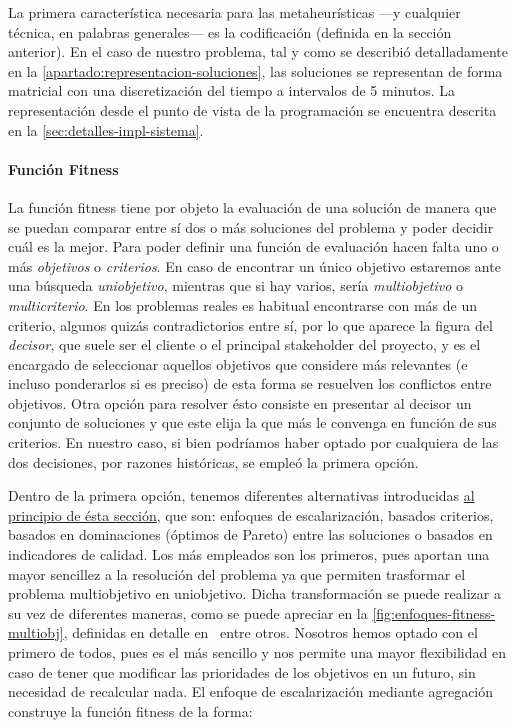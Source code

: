 La primera característica necesaria para las metaheurísticas ---y cualquier técnica, en palabras generales--- es la codificación (definida en la sección anterior). En el caso de nuestro problema, tal y como se describió detalladamente en la \autoref{apartado:representacion-soluciones}, las soluciones se representan de forma matricial con una discretización del tiempo a intervalos de 5 minutos. La representación desde el punto de vista de la programación se encuentra descrita en la \autoref{sec:detalles-impl-sistema}. %


\paragraph{Función Fitness} \label{apartado:adaptacion-fitness}

La función fitness tiene por objeto la evaluación de una solución de manera que se puedan comparar entre sí dos o más soluciones del problema y poder decidir cuál es la mejor.  Para poder definir una función de evaluación hacen falta uno o más \textit{objetivos} o \textit{criterios}. En caso de encontrar un único objetivo estaremos ante una búsqueda \textit{uniobjetivo}, mientras que si hay varios, sería \textit{multiobjetivo} o \textit{multicriterio}. En los problemas reales es habitual encontrarse con más de un criterio, algunos quizás contradictorios entre sí, por lo que aparece la figura del \textit{decisor}, que suele ser el cliente o el principal stakeholder del proyecto, y es el encargado de seleccionar aquellos objetivos que considere más relevantes (e incluso ponderarlos si es preciso) de esta forma se resuelven los conflictos entre objetivos. Otra opción para resolver ésto consiste en presentar al decisor un conjunto de soluciones y que este elija la que más le convenga en función de sus criterios. En nuestro caso, si bien podríamos haber optado por cualquiera de las dos decisiones, por razones históricas, se empleó la primera opción. 

Dentro de la primera opción, tenemos diferentes alternativas introducidas \hyperref[sec:3:metaheurística]{al principio de ésta sección}, que son: enfoques de escalarización, basados criterios, basados en dominaciones (óptimos de Pareto) entre las soluciones o basados en indicadores de calidad. Los más empleados son los primeros, pues aportan una mayor sencillez a la resolución del problema ya que permiten trasformar el problema multiobjetivo en uniobjetivo. Dicha transformación se puede realizar a su vez de diferentes maneras, como se puede apreciar en la \autoref{fig:enfoques-fitness-multiobj}, definidas en detalle en~\cite{sota:metaheuristicas-design-impl} entre otros. Nosotros hemos optado con el primero de todos, pues es el más sencillo y nos permite una mayor flexibilidad en caso de tener que modificar las prioridades de los objetivos en un futuro, sin necesidad de recalcular nada. El enfoque de escalarización mediante agregación construye la función fitness de la forma:

